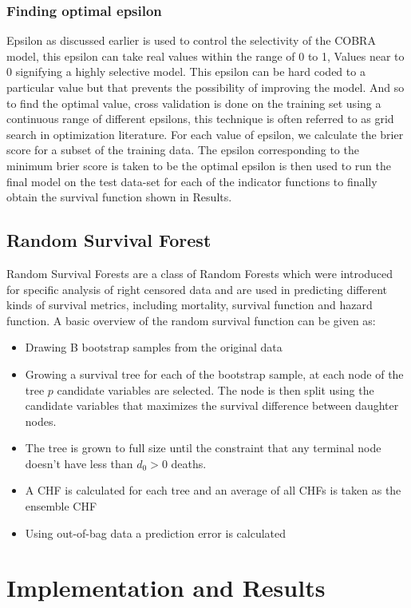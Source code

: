 \documentclass[13pt]{article}
\begin{document}
\subsubsection{Finding optimal epsilon}
Epsilon as discussed earlier is used to control the selectivity of the COBRA model, this epsilon can take real values within the range of 0 to 1, Values near to 0 signifying a highly selective model. This epsilon can be hard coded to a particular value but that prevents the possibility of improving the model. And so to find the optimal value, cross validation is done on the training set using a continuous range of different epsilons, this technique is often referred to as grid search in optimization literature. For each value of epsilon, we calculate the brier score for a subset of the training data. The epsilon corresponding to the minimum brier score is taken to be the optimal epsilon is then used to run the final model on the test data-set for each of the indicator functions to finally obtain the survival function shown in Results.  
\subsection{Random Survival Forest}
Random Survival Forests are a class of Random Forests which were introduced for specific analysis of right censored data and are used in predicting different kinds of survival metrics, including mortality, survival function and hazard function. A basic overview of the random survival function can be given as: 
\begin{itemize}
    \item Drawing B bootstrap samples from the original data
    \item Growing a survival tree for each of the bootstrap sample, at each node of the tree $p$ candidate variables are selected. The node is then split using the candidate variables that maximizes the survival difference between daughter nodes. 
    \item The tree is grown to full size until the constraint that any terminal node doesn't have less than $d_0 > 0$ deaths.
    \item A CHF is calculated for each tree and an average of all CHFs is taken as the ensemble CHF
    \item Using out-of-bag data a prediction error is calculated
\end{itemize}

\section{Implementation and Results}
\end{document}
